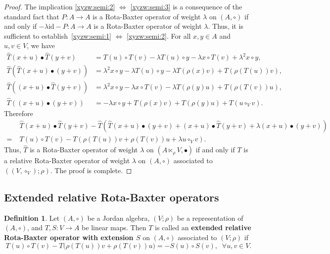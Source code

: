 \documentclass[12pt, reqno, a4paper]{amsart}
\theoremstyle{definition}
\newtheorem{definition}[theorem]{Definition}
\newcommand{\id}{\mathrm{id}}
\begin{document}
\begin{proof}
	The implication \ref{xyzw:semi:2} $\Longleftrightarrow $ \ref{xyzw:semi:3} is a consequence of the standard fact that $P: A \to A$ is a Rota-Baxter operator of weight $\lambda$ on $(A, \circ)$ if and only if $-\lambda \id-P: A \to A$ is a Rota-Baxter operator of weight $\lambda$.
	Thus, it is sufficient to establish~\ref{xyzw:semi:1} $\Longleftrightarrow$ \ref{xyzw:semi:2}.
	For all $x, y \in A$ and $u, v \in V$, we have
	\begin{align*}
		\widehat{T}(x + u) \bullet \widehat{T}(y+ v)  & =  T(u) \circ T(v) -  \lambda T(u) \circ y -  \lambda x \circ T(v)+\lambda^{2} x \circ y,   \\
		\widehat{T}(\widehat{T}(x + u) \bullet (y+v)) & = \lambda^{2} x \circ y - \lambda T(u) \circ y - \lambda T(\rho(x) v) +  T(\rho(T(u)) v), \\
		\widehat{T}((x+u) \bullet \widehat{T}(y+v))   & =\lambda^{2} x \circ y -  \lambda x \circ T(v) -  \lambda T( \rho(y)u) +  T( \rho(T(v))u),  \\
		\widehat{T}((x+ u) \bullet (y+v))         & = -\lambda x \circ y + T(\rho(x) v) + T(\rho(y)u) + T(u \circ_V v).
	\end{align*}
	Therefore
	\begin{align*}
		& \widehat{T}(x + u) \bullet \widehat{T}(y+ v) - \widehat{T}(\widehat{T}(x + u) \bullet (y+v) + (x+u) \bullet \widehat{T}(y+v) + \lambda (x+ u) \bullet (y+v)) \\
		=\; & T(u) \circ T(v) - T(\rho(T(u)) v + \rho(T(v))u + \lambda u \circ_V v ).
	\end{align*}
	Thus, $\widehat{T}$ is a Rota-Baxter operator of weight $\lambda$ on $(A \ltimes_{\rho} V, \bullet)$ if and only if $T$ is a relative Rota-Baxter operator of weight $\lambda$ on $(A, \circ)$ associated to $((V, \circ_{V}); \rho)$.
	The proof is complete.
\end{proof}



\subsection{Extended relative Rota-Baxter operators}


\begin{definition}
	Let $(A, \circ)$ be a Jordan algebra, $(V; \rho)$ be a representation of $(A, \circ)$, and $T, S: V \to A$ be linear maps.
	Then $T$ is called an \textbf{extended relative Rota-Baxter operator with extension $S$} on $(A, \circ)$ associated to $(V; \rho)$ if
	\begin{equation}
		T(u) \circ T(v) - T\big(\rho(T(u))v + \rho(T(v))u \big)  = - S(u) \circ S(v), \;\; \forall u, v \in V. \label{eq:exto}
	\end{equation}
\end{definition}
\end{document}
